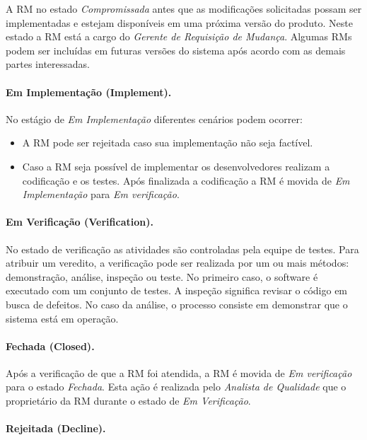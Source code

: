 A RM no estado \textit{Compromissada} antes que as modificações solicitadas
possam ser implementadas e estejam disponíveis em uma próxima versão do produto.
Neste estado a RM está a cargo do \textit{Gerente de Requisição de Mudança}.
Algumas RMs podem ser incluídas em futuras versões do sistema após acordo com
as demais partes interessadas.

\paragraph{Em Implementação (Implement).}
\label{par:em_implementacao}

No estágio de \textit{Em Implementação} diferentes cenários podem ocorrer:

\begin{itemize}
	\item A RM pode ser rejeitada caso sua implementação não seja factível.
	\item Caso a RM seja possível de implementar os desenvolvedores realizam a
		codificação e os testes. Após finalizada a codificação a RM é movida de
		\textit{Em Implementação} para \textit{Em verificação}.
\end{itemize}

\paragraph{Em Verificação (Verification).}
\label{par:em_verificacao}

No estado de verificação as atividades são controladas pela equipe de testes.
Para atribuir um veredito, a verificação pode ser realizada por um ou mais
métodos: demonstração, análise, inspeção ou teste. No primeiro caso, o software
é executado com um conjunto de testes. A inspeção significa revisar o código em
busca de defeitos. No caso da análise, o processo consiste em demonstrar que o
sistema está em operação.

\paragraph{Fechada (Closed).}
\label{par:fechada}

Após a verificação de que a RM foi atendida, a RM é movida de \textit{Em
	verificação} para o estado \textit{Fechada}. Esta ação é realizada pelo
\textit{Analista de Qualidade} que o proprietário da RM durante o estado de
\textit{Em Verificação}.

\paragraph{Rejeitada (Decline).}
\label{par:rejeitada}

